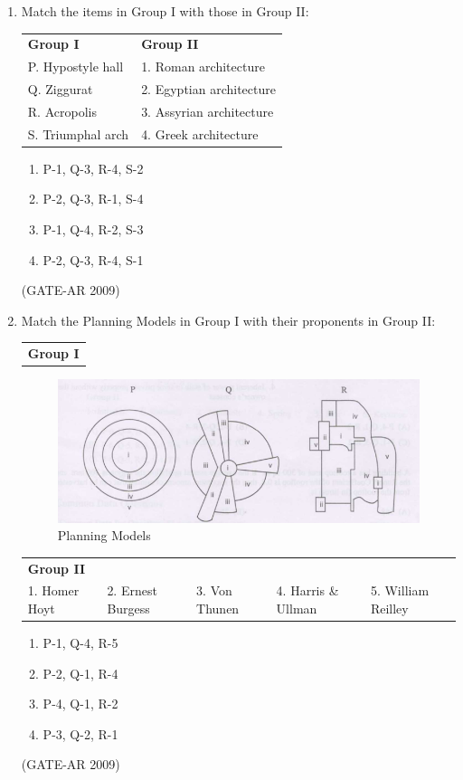 \documentclass[a4paper,10pt]{article}
\begin{document}
\begin{enumerate}
    \item Match the items in Group I with those in Group II:  \\
    \begin{tabular}{ l l }
	\textbf{Group I} & \textbf{Group II} \\
	P. Hypostyle hall & 1. Roman architecture \\
	Q. Ziggurat & 2. Egyptian architecture \\
	R. Acropolis & 3. Assyrian architecture \\
	S. Triumphal arch & 4. Greek architecture \\
	\end{tabular}
	\begin{multicols}{2}
	\begin{enumerate}
        \item P-1, Q-3, R-4, S-2
        \item P-2, Q-3, R-1, S-4
        \item P-1, Q-4, R-2, S-3
        \item P-2, Q-3, R-4, S-1
    \end{enumerate}
	\end{multicols}
    \hfill (GATE-AR 2009)

    \item Match the Planning Models in Group I with their proponents in Group II:  \\
    \begin{tabular}{ l }
	\textbf{Group I} \\
	\end{tabular}
	\begin{figure}[h!]
        \centering
        \includegraphics[width=0.5\columnwidth]{figs/3.png}
	\caption{Planning Models}
	\label{fig:Img03}
	\end{figure}
    \begin{tabular}{ l l l l l }
	\textbf{Group II} & & \\
	1. Homer Hoyt & 2. Ernest Burgess & 3. Von Thunen & 4. Harris \& Ullman & 5. William Reilley \\
	\end{tabular}
	\begin{multicols}{2}
	\begin{enumerate}
        \item P-1, Q-4, R-5
        \item P-2, Q-1, R-4
        \item P-4, Q-1, R-2
        \item P-3, Q-2, R-1
    \end{enumerate}
	\end{multicols}
    \hfill (GATE-AR 2009)


\end{enumerate}
\end{document}
